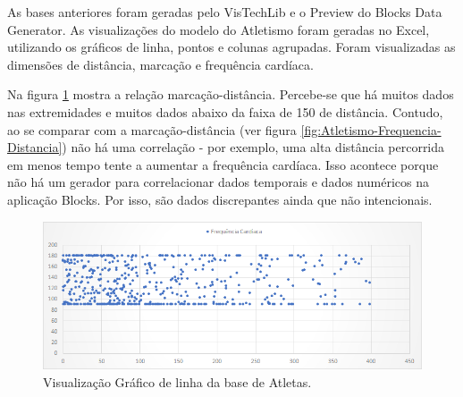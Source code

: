 \documentclass[
	12pt,				%
	openright,			%
	twoside,			%
	a4paper,			%
	english,			%
	brazil				%
	]{abntex2}
\begin{document}


	As bases anteriores foram geradas pelo VisTechLib e o Preview do Blocks Data Generator.
	As visualizações do modelo do Atletismo foram geradas no Excel, utilizando os gráficos de linha, pontos e colunas agrupadas.
	Foram visualizadas as dimensões de distância, marcação e frequência cardíaca.
	\par
	Na figura \ref{fig:Atletismo-Marcacao-Distancia} mostra a relação marcação-distância.
	Percebe-se que há muitos dados nas extremidades e muitos dados abaixo da faixa de 150 de distância.
	Contudo, ao se comparar com a marcação-distância (ver figura \ref{fig:Atletismo-Frequencia-Distancia}) não há uma correlação - por exemplo, uma alta distância percorrida em menos tempo tente a aumentar a frequência cardíaca.
	Isso acontece porque não há um gerador para correlacionar dados temporais e dados numéricos na aplicação Blocks.
	Por isso, são dados discrepantes ainda que não intencionais.
	\par

	\begin{figure}[h!]
		\centering
		\includegraphics[width=\linewidth]{./figures/Resultados/Atletismo-Marcacao-Distancia.png}
		\caption{Visualização Gráfico de linha da base de Atletas.}
		\label{fig:Atletismo-Marcacao-Distancia}
	\end{figure}
\end{document}
